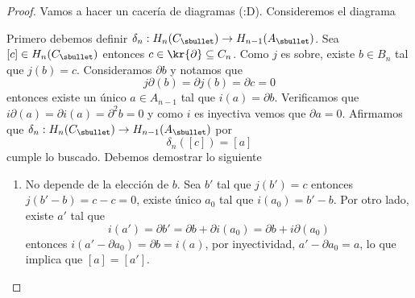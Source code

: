 \documentclass{article}
\begin{document}
\begin{proof}
    Vamos a hacer un cacería de diagramas (:D). Consideremos el diagrama

    \vspace{2mm}
    \centerline{
    }
    \vspace{2mm}
    \noindent Primero debemos definir $\delta_{n}:H_{n}(C_{\sbullet})\to H_{n-1}(A_{\sbullet})$.
    Sea $[c]\in H_{n}(C_{\sbullet})$ entonces $c\in\kr{\partial}\subseteq C_{n}$. Como $j$ es 
    sobre, existe $b\in B_{n}$ tal que $j(b)=c$. Consideramos $\partial b$ y notamos que
    \begin{equation*}
        j\partial(b)=\partial j(b)=\partial c=0
    \end{equation*}
    entonces existe un único $a\in A_{n-1}$ tal que $i(a)=\partial b$. Verificamos que 
    $i\partial(a)=\partial i(a)=\partial^{2}b=0$ y como $i$ es inyectiva vemos que 
    $\partial a=0$. Afirmamos que $\delta_{n}:H_{n}(C_{\sbullet})\to H_{n-1}(A_{\sbullet})$ por
    \begin{equation*}
        \delta_{n}([c])=[a]
    \end{equation*}
    cumple lo buscado. Debemos demostrar lo siguiente
    \begin{enumerate}
        \item No depende de la elección de $b$. Sea $b'$ tal que $j(b')=c$ entonces 
        $j(b'-b)=c-c=0$, existe único $a_{0}$ tal que $i(a_{0})=b'-b$. Por otro lado, existe $a'$
        tal que
        \begin{equation*}
            i(a')=\partial b'=\partial b+\partial i(a_{0})=\partial b+i\partial(a_{0})
        \end{equation*}
        entonces $i(a'-\partial a_{0})=\partial b=i(a)$, por inyectividad, $a'-\partial a_{0}=a$,
        lo que implica que $[a]=[a']$.


\end{enumerate}
\end{proof}
\end{document}
